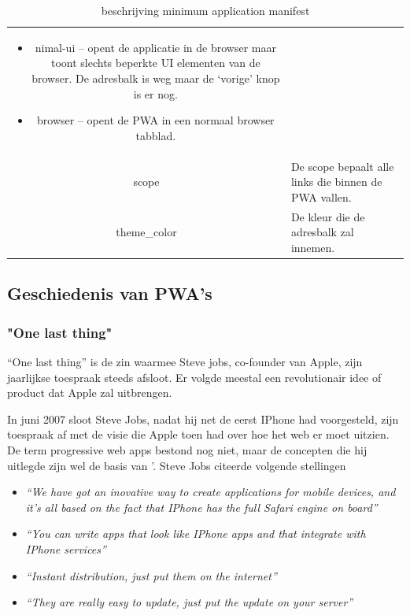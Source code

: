 \begin{table}[H]
\begin{tabular}{cp{12cm}}
\begin{itemize}
			     		  \item nimal-ui – opent de applicatie in de browser maar toont slechts beperkte UI elementen van de browser. De adresbalk is weg maar de ‘vorige’ knop is er nog.
			     		  \item browser – opent de PWA in een normaal browser tabblad.
		     		\end{itemize} \\
	     		scope & De scope bepaalt alle links die binnen de PWA vallen. \\
	     		theme\_color & De kleur die de adresbalk zal innemen.
			\end{tabular}	
			\caption{beschrijving minimum application manifest}
		\end{table}
				
			
	
	
	\autocite{LePage2020}

\subsection{Geschiedenis van PWA's}

	\subsubsection{"One last thing"}
	
		 “One last thing” is de zin waarmee Steve jobs, co-founder van Apple, zijn jaarlijkse toespraak steeds afsloot. Er volgde meestal een revolutionair idee of product dat Apple zal uitbrengen.
		
		In juni 2007 sloot Steve Jobs, nadat hij net de eerst IPhone had voorgesteld, zijn toespraak af met de visie die Apple toen had over hoe het web er moet uitzien. De term progressive web apps bestond nog niet, maar de concepten die hij uitlegde zijn wel de basis van '. Steve Jobs citeerde volgende stellingen
	
		
		\begin{itemize}
			\item \textit{ “We have got an inovative way to create applications for mobile devices, and it’s all based on the fact that IPhone has the full Safari engine on board”}
			\item \textit{ “You can write apps that look like IPhone apps and that integrate with IPhone services”}
			\item \textit{ “Instant distribution, just put them on the internet”}
			\item \textit{ “They are really easy to update, just put the update on your server”}
		\end{itemize}
		\autocite{Jobs2007}
		
